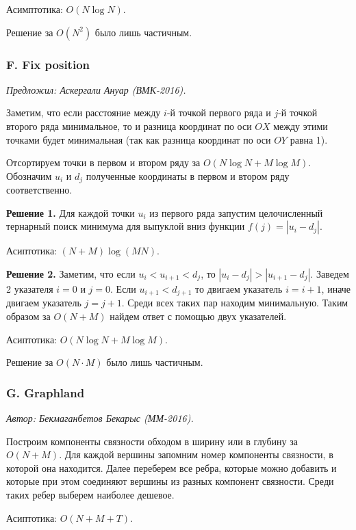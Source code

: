 \documentclass[11pt, a4paper]{article}
\newcommand{\problemauthor}[1]{
\begin{flushright}
\textit{Автор: #1}
\end{flushright}
}
\newcommand{\problemofferer}[1]{
\begin{flushright}
\textit{Предложил: #1}
\end{flushright}
}
\begin{document}
Асимптотика: $O(N \log N)$. 

Решение за $O(N^2)$ было лишь частичным.

\subsubsection*{F. Fix position}


\problemofferer{Аскергали Ануар (ВМК-2016).}

Заметим, что если расстояние между $i$-й точкой первого ряда и $j$-й точкой второго ряда минимальное, то и разница координат по оси $OX$ между этими точками будет минимальная (так как разница координат по оси $OY$ равна 1). 

Отсортируем точки в первом и втором ряду за $O(N \log N + M \log M)$. Обозначим $u_i$ и $d_j$ полученные координаты в первом и втором ряду соответственно.

\textbf{Решение 1.} Для каждой точки $u_i$ из первого ряда запустим целочисленный тернарный поиск минимума для выпуклой вниз функции $f(j) = |u_i  - d_j|$.

Асиптотика: $(N + M) \log (M N)$.

\textbf{Решение 2.} Заметим, что если $u_i < u_{i+1} < d_j$, то $|u_i - d_j|> |u_{i+1} - d_j|$. Заведем 2 указателя $i = 0$ и $j = 0$. Если $u_{i+1} < d_{j + 1}$ то двигаем указатель $i = i + 1$, иначе двигаем указатель $j = j + 1$. Среди всех таких пар находим минимальную. Таким образом за $O(N + M)$ найдем ответ с помощью двух указателей.

Асиптотика: $O(N \log N + M \log M)$.

Решение за $O(N \cdot M)$ было лишь частичным.

\subsubsection*{G. Graphland}


\problemauthor{Бекмаганбетов Бекарыс (ММ-2016).}


Построим компоненты связности обходом в ширину или в глубину за $O(N + M)$. Для каждой вершины запомним номер компоненты связности, в которой она находится. Далее переберем все ребра, которые можно добавить и которые при этом соединяют вершины из разных компонент связности. Среди таких ребер выберем наиболее дешевое.

Асиптотика: $O(N + M + T)$.
\end{document}
